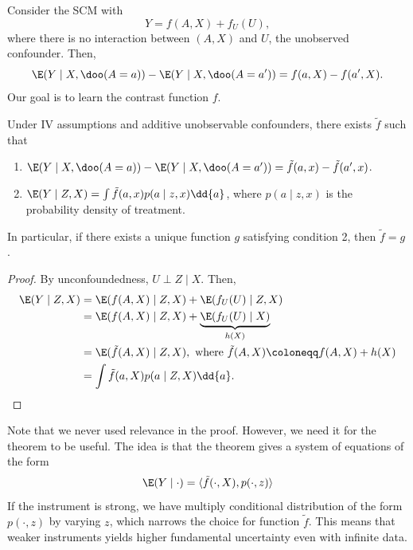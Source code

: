 \documentclass{article}
\begin{document}
Consider the SCM with 
\begin{equation*}
    Y = f(A, X) + f_U(U),
\end{equation*}
where there is no interaction between \((A, X)\) and \(U\), the unobserved confounder. Then,
\begin{equation*}
    \E(Y\mid X, \doo(A = a)) - \E(Y\mid  X, \doo(A = a')) = f(a, X)- f(a', X).
\end{equation*}
Our goal is to learn the contrast function \(f\).

\begin{theorem}
    \label{thm:iv}
    Under IV assumptions and additive unobservable confounders, there exists \(\tilde{f}\) such that
    \begin{enumerate}
        \item \(\E(Y\mid X, \doo(A = a)) -\E(Y\mid X, \doo(A = a')) = \tilde{f}(a, x) - \tilde{f}(a', x)\).
        \item \(\E(Y \mid Z, X) = \int\tilde{f}(a, x)p(a\mid z, x)\dd{a}\), where \(p(a\mid z, x)\) is the probability density of treatment.
    \end{enumerate}
    In particular, if there exists a unique function \(g\) satisfying condition 2, then \(\tilde{f} = g\).
\end{theorem}

\begin{proof}
    By unconfoundedness, \(U\perp Z\mid X\). Then,
    \begin{align*}
        \E(Y\mid Z, X) & = \E(f(A, X)\mid Z, X) + \E(f_U(U)\mid Z, X)\\
        & = \E(f(A, X)\mid Z, X) + \underbrace{\E(f_U(U)\mid X)}_{h(X)}\\
        & = \E(\tilde{f}(A, X)\mid Z, X), \text{ where }\tilde{f}(A, X)\coloneqq f(A, X) + h(X)\\
        & = \int\tilde{f}(a, X)p(a\mid Z, X)\dd{a}.
    \end{align*}
\end{proof}
Note that we never used relevance in the proof. However, we need it for the theorem to be useful. The idea is that the theorem  gives a system of equations of the form
\begin{equation*}
    \E(Y\mid \cdot) = \langle\tilde{f}(\cdot,X ), p(\cdot, z)\rangle
\end{equation*}
If the instrument is strong, we have multiply conditional distribution of the form \(p(\cdot, z)\) by varying \(z\), which narrows the choice for function \(\tilde{f}\). This means that weaker instruments yields higher fundamental uncertainty even with infinite data.
\end{document}
